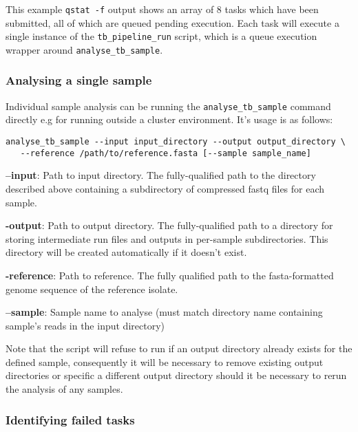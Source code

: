 \documentclass[a4paper,10pt,twoside]{article}
\newenvironment{tight_itemize}{
\begin{itemize}
  \setlength{\itemsep}{0pt}
  \setlength{\parskip}{0pt}
}{\end{itemize}}
\begin{document}
This example {\tt qstat -f} output shows an array of 8 tasks which have been
submitted, all of which are queued pending execution.  Each task will execute a
single instance of the {\tt tb\_pipeline\_run} script, which is a queue
execution wrapper around {\tt analyse\_tb\_sample}.

\subsubsection {Analysing a single sample}

Individual sample analysis can be running the {\tt analyse\_tb\_sample} command
directly e.g for running outside a cluster environment. It's usage is as follows:

\begin{verbatim}
analyse_tb_sample --input input_directory --output output_directory \
   --reference /path/to/reference.fasta [--sample sample_name]
\end{verbatim}

\begin{tight_itemize}
\item \textbf{--input}: Path to input directory. The fully-qualified path to
the directory described above containing a subdirectory of compressed fastq
files for each sample.
 \item \textbf{-output}: Path to output directory. The fully-qualified path to a
directory for storing intermediate run files and outputs in per-sample
subdirectories. This directory will be created automatically if it doesn't
exist. 
\item \textbf{-reference}: Path to reference. The fully qualified path to the
fasta-formatted genome sequence of the reference isolate.
\item \textbf{--sample}: Sample name to analyse (must match directory name
containing sample's reads in the input directory) 
\end{tight_itemize}

Note that the script will refuse to run if an output directory already exists
for the defined sample, consequently it will be necessary to remove existing
output directories or specific a different output directory should it be
necessary to rerun the analysis of any samples. 

\subsubsection{Identifying failed tasks}
\end{document}
